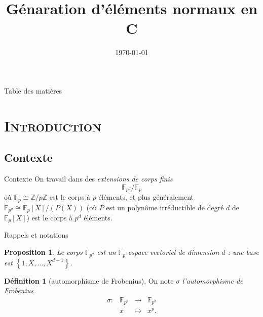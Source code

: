 \documentclass[xcolor=x11names,compress]{beamer}
\theoremstyle{break}
\newtheorem{prop}[thm]{Proposition}
\theoremstyle{sc}
\theoremstyle{definition}
\newtheorem{defi}[thm]{Définition}
\theoremstyle{remark}
\begin{document}
\begin{frame}
\title{Génaration d'éléments normaux en C}
\date{\today}
\titlepage
\end{frame}

\begin{frame}{Table des matières}
\tableofcontents
\end{frame}

\section{\scshape Introduction}
\subsection{Contexte}
\begin{frame}{Contexte}
  On travail dans des \emph{extensions de corps finis} 
  \[
    \mathbb{F}_{p^d}/\mathbb{F}_p
  \]
  où $\mathbb{F}_p\cong \mathbb{Z}/p\mathbb{Z}$ est le corps à $p$ éléments, et
  plus généralement $\mathbb{F}_{p^d}\cong\mathbb{F}_p[X]/(P(X))$ (où $P$ est un
  polynôme irréductible de degré $d$ de $\mathbb{F}_p[X]$) est le corps à $p^d$ éléments.
\end{frame}

\begin{frame}{Rappels et notations}
  \begin{prop}
  Le corps $\mathbb{F}_{p^d}$ est un $\mathbb{F}_p$-espace vectoriel de
  dimension $d$ : une base est $\left\{ 1, X, \dots, X^{d-1} \right\}$.
  \end{prop}
  \begin{defi}[automorphisme de Frobenius]
    On note $\sigma$ \emph{l'automorphisme de Frobenius}
    \[
      \begin{array}{cccc}
        \sigma: & \mathbb{F}_{p^d} & \to & \mathbb{F}_{p^d} \\
        & x & \mapsto & x^p.
      \end{array}
    \]
  \end{defi}
\end{frame}
\end{document}
